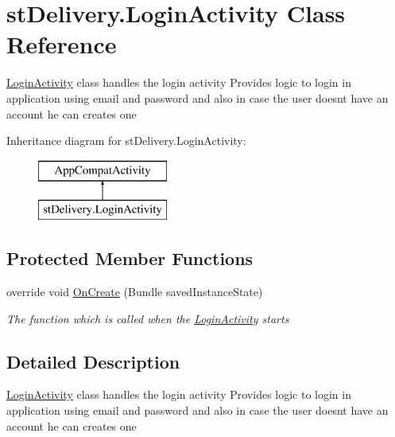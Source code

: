 \hypertarget{classst_delivery_1_1_login_activity}{}\section{st\+Delivery.\+Login\+Activity Class Reference}
\label{classst_delivery_1_1_login_activity}


\hyperlink{classst_delivery_1_1_login_activity}{Login\+Activity} class handles the login activity Provides logic to login in application using email and password and also in case the user doesn\textquotesingle{}t have an account he can creates one  


Inheritance diagram for st\+Delivery.\+Login\+Activity\+:\begin{figure}[H]
\begin{center}
\leavevmode
\includegraphics[height=2.000000cm]{classst_delivery_1_1_login_activity}
\end{center}
\end{figure}
\subsection*{Protected Member Functions}
\begin{DoxyCompactItemize}
\item 
override void \hyperlink{classst_delivery_1_1_login_activity_aa9e751128088d9a6077d8190ba3738ff}{On\+Create} (Bundle saved\+Instance\+State)
\begin{DoxyCompactList}\small\item\em The function which is called when the \hyperlink{classst_delivery_1_1_login_activity}{Login\+Activity} starts \end{DoxyCompactList}\end{DoxyCompactItemize}


\subsection{Detailed Description}
\hyperlink{classst_delivery_1_1_login_activity}{Login\+Activity} class handles the login activity Provides logic to login in application using email and password and also in case the user doesn\textquotesingle{}t have an account he can creates one 



